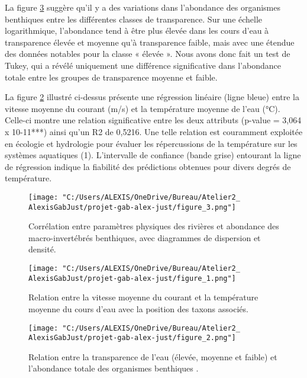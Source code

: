 \documentclass[9pt,twocolumn,twoside,]{pnas-new}
\begin{document}
La figure \ref{fig:plot2} suggère qu'il y a des variations dans
l'abondance des organismes benthiques entre les différentes classes de
transparence. Sur une échelle logarithmique, l'abondance tend à être
plus élevée dans les cours d'eau à transparence élevée et moyenne qu'à
transparence faible, mais avec une étendue des données notables pour la
classe « élevée ». Nous avons donc fait un test de Tukey, qui a révélé
uniquement une différence significative dans l'abondance totale entre
les groupes de transparence moyenne et faible.

La figure \ref{fig:plot3} illustré ci-dessus présente une régression
linéaire (ligne bleue) entre la vitesse moyenne du courant (m/s) et la
température moyenne de l'eau (°C). Celle-ci montre une relation
significative entre les deux attributs (p-value = 3,064 x 10-11***)
ainsi qu'un R2 de 0,5216. Une telle relation est couramment exploitée en
écologie et hydrologie pour évaluer les répercussions de la température
sur les systèmes aquatiques (1). L'intervalle de confiance (bande grise)
entourant la ligne de régression indique la fiabilité des prédictions
obtenues pour divers degrés de température.

\begin{figure}
\centering
\texttt{[image: "C:/Users/ALEXIS/OneDrive/Bureau/Atelier2\_ AlexisGabJust/projet-gab-alex-just/figure\_3.png"]}
\caption{Corrélation entre paramètres physiques des rivières et
abondance des macro-invertébrés benthiques, avec diagrammes de
dispersion et densité. \label{fig:plot1}}
\end{figure}

\begin{figure}
\centering
\texttt{[image: "C:/Users/ALEXIS/OneDrive/Bureau/Atelier2\_ AlexisGabJust/projet-gab-alex-just/figure\_1.png"]}
\caption{Relation entre la vitesse moyenne du courant et la température
moyenne du cours d'eau avec la position des taxons associés.
\label{fig:plot3}}
\end{figure}

\begin{figure}
\centering
\texttt{[image: "C:/Users/ALEXIS/OneDrive/Bureau/Atelier2\_ AlexisGabJust/projet-gab-alex-just/figure\_2.png"]}
\caption{Relation entre la transparence de l'eau (élevée, moyenne et
faible) et l'abondance totale des organismes benthiques .
\label{fig:plot2}}
\end{figure}
\end{document}

